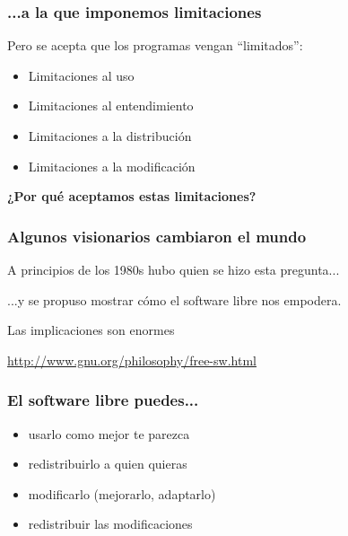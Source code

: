 \documentclass[17pt,aspectratio=169]{beamer}
\begin{document}
\begin{frame}
\frametitle{...a la que imponemos limitaciones}

Pero se acepta que los programas vengan ``limitados'':

\vspace{.2cm}

\begin{itemize}
\item Limitaciones al uso
\item Limitaciones al entendimiento
\item Limitaciones a la distribución
\item Limitaciones a la modificación
\end{itemize}

\end{frame}


\begin{frame}

\begin{center}
\textbf{\Huge ¿Por qué aceptamos estas limitaciones?}
\end{center}
\end{frame}


\begin{frame}
\frametitle{Algunos visionarios cambiaron el mundo}

A principios de los 1980s hubo quien se hizo esta pregunta...

\vspace{.1cm}

...y se propuso mostrar cómo el software libre nos empodera.

\vspace{.1cm}

Las implicaciones son enormes

\begin{flushright}
{\small \url{http://www.gnu.org/philosophy/free-sw.html}}
\end{flushright}
\end{frame}


\begin{frame}
\frametitle{El software libre puedes...}

{\large
\begin{itemize}
\item usarlo como mejor te parezca
\item redistribuirlo a quien quieras
\item modificarlo (mejorarlo, adaptarlo)
\item redistribuir las modificaciones
\end{itemize}
}
\end{frame}
\end{document}
